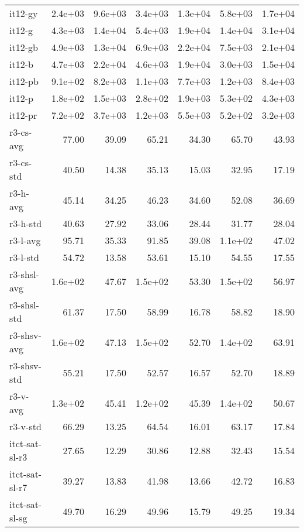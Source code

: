 \begin{tabular}{lrrrrrr}
it12-gy             & 2.4e+03 & 9.6e+03 & 3.4e+03 & 1.3e+04 & 5.8e+03 & 1.7e+04 \\
it12-g              & 4.3e+03 & 1.4e+04 & 5.4e+03 & 1.9e+04 & 1.4e+04 & 3.1e+04 \\
it12-gb             & 4.9e+03 & 1.3e+04 & 6.9e+03 & 2.2e+04 & 7.5e+03 & 2.1e+04 \\
it12-b              & 4.7e+03 & 2.2e+04 & 4.6e+03 & 1.9e+04 & 3.0e+03 & 1.5e+04 \\
it12-pb             & 9.1e+02 & 8.2e+03 & 1.1e+03 & 7.7e+03 & 1.2e+03 & 8.4e+03 \\
it12-p              & 1.8e+02 & 1.5e+03 & 2.8e+02 & 1.9e+03 & 5.3e+02 & 4.3e+03 \\
it12-pr             & 7.2e+02 & 3.7e+03 & 1.2e+03 & 5.5e+03 & 5.2e+02 & 3.2e+03 \\
r3-cs-avg           &   77.00 &   39.09 &   65.21 &   34.30 &   65.70 &   43.93 \\
r3-cs-std           &   40.50 &   14.38 &   35.13 &   15.03 &   32.95 &   17.19 \\
r3-h-avg            &   45.14 &   34.25 &   46.23 &   34.60 &   52.08 &   36.69 \\
r3-h-std            &   40.63 &   27.92 &   33.06 &   28.44 &   31.77 &   28.04 \\
r3-l-avg            &   95.71 &   35.33 &   91.85 &   39.08 & 1.1e+02 &   47.02 \\
r3-l-std            &   54.72 &   13.58 &   53.61 &   15.10 &   54.55 &   17.55 \\
r3-shsl-avg         & 1.6e+02 &   47.67 & 1.5e+02 &   53.30 & 1.5e+02 &   56.97 \\
r3-shsl-std         &   61.37 &   17.50 &   58.99 &   16.78 &   58.82 &   18.90 \\
r3-shsv-avg         & 1.6e+02 &   47.13 & 1.5e+02 &   52.70 & 1.4e+02 &   63.91 \\
r3-shsv-std         &   55.21 &   17.50 &   52.57 &   16.57 &   52.70 &   18.89 \\
r3-v-avg            & 1.3e+02 &   45.41 & 1.2e+02 &   45.39 & 1.4e+02 &   50.67 \\
r3-v-std            &   66.29 &   13.25 &   64.54 &   16.01 &   63.17 &   17.84 \\
itct-sat-sl-r3      &   27.65 &   12.29 &   30.86 &   12.88 &   32.43 &   15.54 \\
itct-sat-sl-r7      &   39.27 &   13.83 &   41.98 &   13.66 &   42.72 &   16.83 \\
itct-sat-sl-sg      &   49.70 &   16.29 &   49.96 &   15.79 &   49.25 &   19.34 \\

\end{tabular}
